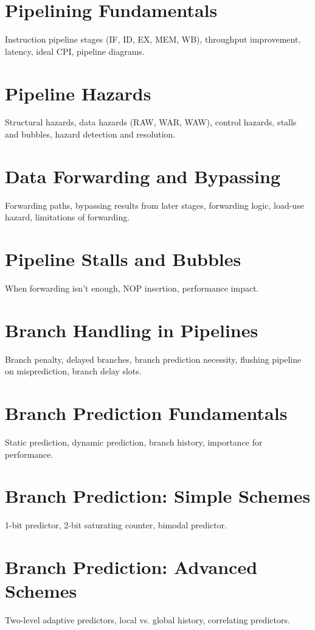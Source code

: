 
\chapter{Pipelining Fundamentals}
Instruction pipeline stages (IF, ID, EX, MEM, WB), throughput improvement, latency, ideal CPI, pipeline diagrams.

\chapter{Pipeline Hazards}
Structural hazards, data hazards (RAW, WAR, WAW), control hazards, stalls and bubbles, hazard detection and resolution.

\chapter{Data Forwarding and Bypassing}
Forwarding paths, bypassing results from later stages, forwarding logic, load-use hazard, limitations of forwarding.

\chapter{Pipeline Stalls and Bubbles}
When forwarding isn't enough, NOP insertion, performance impact.

\chapter{Branch Handling in Pipelines}
Branch penalty, delayed branches, branch prediction necessity, flushing pipeline on misprediction, branch delay slots.

\chapter{Branch Prediction Fundamentals}
Static prediction, dynamic prediction, branch history, importance for performance.

\chapter{Branch Prediction: Simple Schemes}
1-bit predictor, 2-bit saturating counter, bimodal predictor.

\chapter{Branch Prediction: Advanced Schemes}
Two-level adaptive predictors, local vs. global history, correlating predictors.

